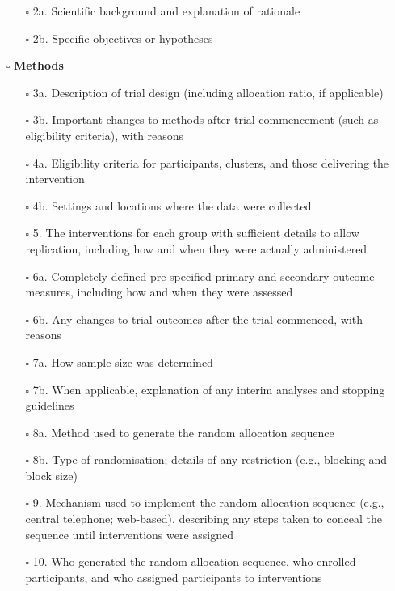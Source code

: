 \documentclass[11pt]{article}
\def\tightlist{}
\begin{document}
\begin{Form}
\begin{itemize}
  \begin{itemize}
  \tightlist
  \item[$\square$]
    2a. Scientific background and explanation of rationale
  \item[$\square$]
    2b. Specific objectives or hypotheses
  \end{itemize}
\item[$\square$]
  \textbf{Methods}

  \begin{itemize}
  \tightlist
  \item[$\square$]
    3a. Description of trial design (including allocation ratio, if
    applicable)
  \item[$\square$]
    3b. Important changes to methods after trial commencement (such as
    eligibility criteria), with reasons
  \item[$\square$]
    4a. Eligibility criteria for participants, clusters, and those
    delivering the intervention
  \item[$\square$]
    4b. Settings and locations where the data were collected
  \item[$\square$]
    5. The interventions for each group with sufficient details to allow
    replication, including how and when they were actually administered
  \item[$\square$]
    6a. Completely defined pre-specified primary and secondary outcome
    measures, including how and when they were assessed
  \item[$\square$]
    6b. Any changes to trial outcomes after the trial commenced, with
    reasons
  \item[$\square$]
    7a. How sample size was determined
  \item[$\square$]
    7b. When applicable, explanation of any interim analyses and
    stopping guidelines
  \item[$\square$]
    8a. Method used to generate the random allocation sequence
  \item[$\square$]
    8b. Type of randomisation; details of any restriction (e.g.,
    blocking and block size)
  \item[$\square$]
    9. Mechanism used to implement the random allocation sequence (e.g.,
    central telephone; web-based), describing any steps taken to conceal
    the sequence until interventions were assigned
  \item[$\square$]
    10. Who generated the random allocation sequence, who enrolled
    participants, and who assigned participants to interventions

\end{itemize}
\end{itemize}
\end{Form}
\end{document}
